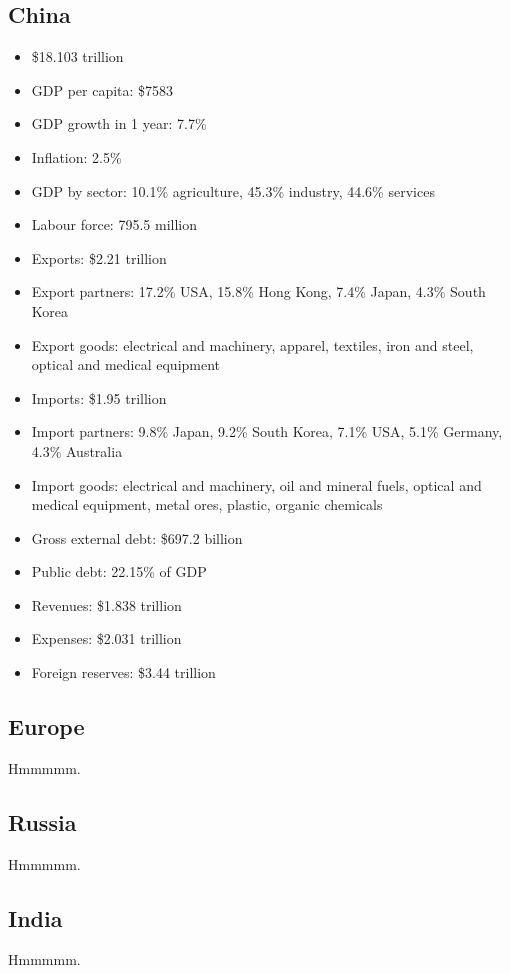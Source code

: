 \documentclass{article}
\begin{document}
\subsection{China}
\begin{itemize}
	\item \$18.103 trillion
	\item GDP per capita: \$7583
	\item GDP growth in 1 year: 7.7\%
	\item Inflation: 2.5\%
	\item GDP by sector: 10.1\% agriculture, 45.3\% industry, 44.6\% services
	\item Labour force: 795.5 million
	\item Exports: \$2.21 trillion
	\item Export partners: 17.2\% USA, 15.8\% Hong Kong, 7.4\% Japan, 4.3\% South Korea
	\item Export goods: electrical and machinery, apparel, textiles, iron and steel, optical and medical equipment
	\item Imports: \$1.95 trillion
	\item Import partners: 9.8\% Japan, 9.2\% South Korea, 7.1\% USA, 5.1\% Germany, 4.3\% Australia
	\item Import goods: electrical and machinery, oil and mineral fuels, optical and medical equipment, metal ores, plastic, organic chemicals
	\item Gross external debt: \$697.2 billion
	\item Public debt: 22.15\% of GDP
	\item Revenues: \$1.838 trillion
	\item Expenses: \$2.031 trillion
	\item Foreign reserves: \$3.44 trillion
\end{itemize}

\subsection{Europe}
Hmmmmm.
\subsection{Russia}
Hmmmmm.
\subsection{India}
Hmmmmm.
\end{document}
